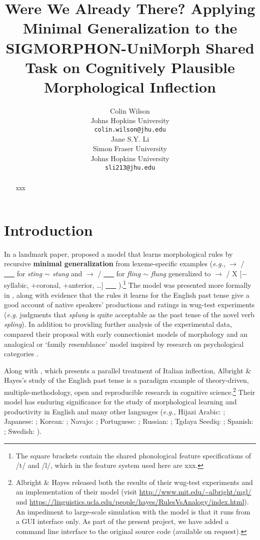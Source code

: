 \documentclass[11pt]{article}
\title{Were We Already There? Applying Minimal Generalization to the SIGMORPHON-UniMorph Shared Task on Cognitively Plausible Morphological Inflection}
\author{Colin Wilson\\
  Johns Hopkins University \\
  \texttt{colin.wilson@jhu.edu} \\\And
  Jane S.Y. Li \\
  Simon Fraser University \\
  Johns Hopkins University \\
  \texttt{sli213@jhu.edu} \\}
\begin{document}
\maketitle
\begin{abstract}
xxx
\end{abstract}

\section{Introduction}

In a landmark paper, \citet{albright2003} proposed a model that learns morphological rules by recursive \textbf{minimal generalization} from lexeme-specific examples (\emph{e.g.},  $\to$  /  \underline{\ \ \ }  for \emph{sting $\sim$ stung} and  $\to$  /  \underline{\ \ \ }  for \emph{fling $\sim$ flung} generalized to   $\to$  / X [$-$syllabic, $+$coronal, $+$anterior, \ldots] \underline{\ \ \ } ).\footnote{The square brackets contain the shared phonological feature specifications of /t/ and /l/, which in the feature system used here are xxx.} The model was presented more formally in \citet{albright-hayes-2002-modeling}, along with evidence that the rules it learns for the English past tense give a good account of native speakers' productions and ratings in wug-test experiments (\emph{e.g.} judgments that \textit{splung} is quite acceptable as the past tense of the novel verb \textit{spling}). In addition to providing further analysis of the experimental data, \citet{albright2003} compared their proposal with early connectionist models of morphology \citep[\emph{e.g.,}][]{plunkett1999} and an analogical or `family resemblance' model inspired by research on psychological categories \citep{nakisa2001}.

Along with \citet{albright2002}, which presents a parallel treatment of Italian inflection, Albright \& Hayes's study of the English past tense is a paradigm example of theory-driven, multiple-methodology, open and reproducible research in cognitive science.\footnote{Albright \& Hayes released both the results of their wug-test experiments and an implementation of their model (visit \url{http://www.mit.edu/~albright/mgl/} and \url{https://linguistics.ucla.edu/people/hayes/RulesVsAnalogy/index.html}). An impediment to large-scale simulation with the model is that it runs from a GUI interface only. As part of the present project, we have added a command line interface to the original source code (available on request).} Their model has enduring significance for the study of morphological learning and productivity in English \citep[\emph{e.g.,}][]{racz-etal-2014-rules, racz2020, corkery-etal-2019-yet} and many other languages (\emph{e.g.,} Hijazi Arabic: \citealt{ahyad2019}; Japanese: \citealt{oseki-etal-2019-inverting}; Korean: \citealt{albright2009}; Navajo: \citealt{albright2006}; Portuguese: \citealt{verissimo2014}; Russian: \citealt{kapatsinski2010}; Tgdaya Seediq: \citealt{kuo2020}; Spanish: \citealt{albright2003}; Swedish: \citealt{strik2014}).
\end{document}
